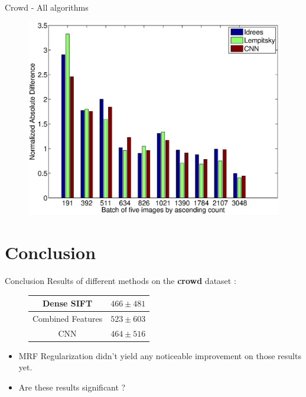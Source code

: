 \documentclass[11pt)]{beamer}
\begin{document}
\begin{frame}{Crowd - All algorithms}
\begin{figure}
\includegraphics[width=\textwidth]{good_compare_bar.eps}
\end{figure}
\end{frame}

\section*{Conclusion}
\begin{frame}{Conclusion}
Results of different methods on the {\bf crowd} dataset :
\begin{figure}
 \centering
  \begin{tabular}{|c|c|}

\hline
Dense SIFT & $466 \pm 481$  \\ \hline
Combined Features & $523 \pm 603$  \\ \hline
CNN & $464 \pm 516$  \\ \hline
\end{tabular}
 \end{figure}


\vspace{0.25cm}
\begin{itemize}
 \item MRF Regularization didn't yield any noticeable improvement on those results yet.

 \item Are these results significant ?
\end{itemize}


\end{frame}
\end{document}
